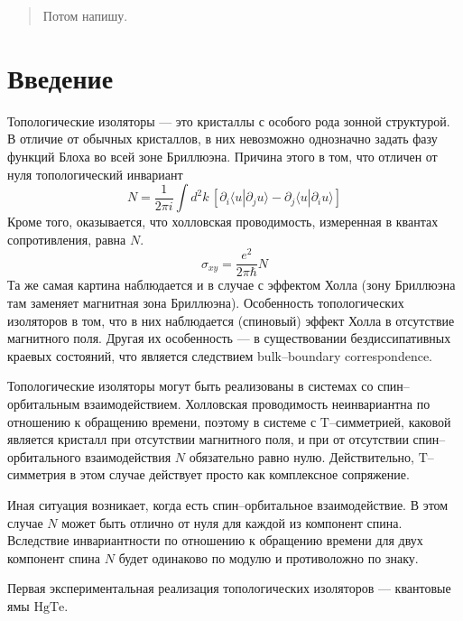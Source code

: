 	\newpage
	\begin{abstract}
        Потом напишу.
	\end{abstract}
	\section{Введение}
    Топологические изоляторы --- это кристаллы с особого рода зонной структурой.
    В отличие от обычных кристаллов, в них невозможно однозначно задать фазу функций 
    Блоха во всей зоне Бриллюэна. Причина этого в том, что отличен от нуля
    топологический инвариант 
    \begin{equation}
        \label{TKNN}
        N = \frac{1}{2\pi i} 
            \int d^2 k\, \left[\partial_i \langle u | \partial_j u \rangle -
            \partial_j \langle u | \partial_i u \rangle \right]
    \end{equation}
    Кроме того, оказывается, что холловская проводимость, измеренная в квантах 
    сопротивления, равна $N$.
    \begin{equation}
        \sigma_{xy} = \frac{e^2}{2\pi \hbar} N
    \end{equation}
    Та же самая картина наблюдается и в случае с эффектом Холла (зону Бриллюэна там 
    заменяет магнитная зона Бриллюэна). Особенность топологических изоляторов в том,
    что в них наблюдается (спиновый) эффект Холла в отсутствие магнитного поля. Другая
    их особенность --- в существовании бездиссипативных краевых состояний, что является
    следствием bulk--boundary correspondence. 

    Топологические изоляторы могут быть реализованы в системах со спин--орбитальным 
    взаимодействием. Холловская проводимость неинвариантна по отношению к обращению
    времени, поэтому в системе с $\mathrm{T}$--симметрией, каковой является кристалл 
    при отсутствии магнитного поля, и при от отсутствии спин--орбитального взаимодействия
    $N$ обязательно равно нулю. Действительно, $\mathrm{T}$--симметрия в этом случае 
    действует просто как комплексное сопряжение. 

    Иная ситуация возникает, когда есть
    спин--орбитальное взаимодействие. В этом случае $N$ может быть отлично от нуля
    для каждой из компонент спина. Вследствие инвариантности по отношению к обращению
    времени для двух компонент спина $N$ будет одинаково по модулю и противоложно 
    по знаку.

    Первая экспериментальная реализация топологических изоляторов --- квантовые ямы 
    $\mathrm{HgTe}$. \cite{Bernevig2006,Konig2007}

